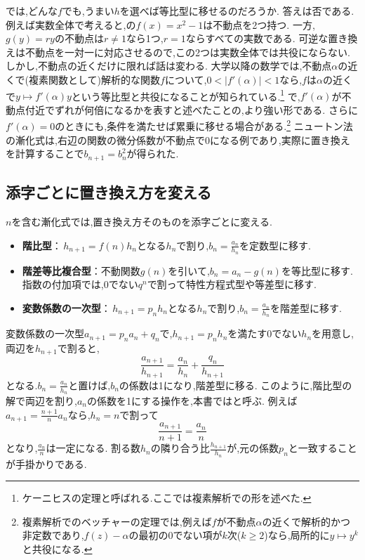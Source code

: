 では,どんな$f$でも,うまい$h$を選べば等比型に移せるのだろうか.
答えは否である.例えば実数全体で考えると,の$f(x)=x^2-1$は不動点を2つ持つ.
一方,$g(y)=ry$の不動点は$r\ne1$なら1つ,$r=1$ならすべての実数である.
可逆な置き換えは不動点を一対一に対応させるので,この2つは実数全体では共役にならない.
しかし,不動点の近くだけに限れば話は変わる.
大学以降の数学では,不動点$\alpha$の近くで(複素関数として)解析的な関数$f$について,$0<|f'(\alpha)|<1$なら,$f$は$\alpha$の近くで$y\mapsto f'(\alpha)y$という等比型と共役になることが知られている.\footnote{ケーニヒスの定理と呼ばれる.ここでは複素解析での形を述べた.}
で,$f'(\alpha)$が不動点付近でずれが何倍になるかを表すと述べたことの,より強い形である.
さらに$f'(\alpha)=0$のときにも,条件を満たせば累乗に移せる場合がある.\footnote{複素解析でのベッチャーの定理では,例えば$f$が不動点$\alpha$の近くで解析的かつ非定数であり,$f(z)-\alpha$の最初の0でない項が$k$次($k\ge2$)なら,局所的に$y\mapsto y^k$と共役になる.}
ニュートン法の漸化式は,右辺の関数の微分係数が不動点で0になる例であり,実際に置き換えを計算することで$b_{n+1}=b_n^2$が得られた.

\subsection{添字ごとに置き換え方を変える}\label{節：添字ごとに置き換え方を変える}

$n$を含む漸化式では,置き換え方そのものを添字ごとに変える.
\begin{itemize}
  \item \textbf{階比型}：\,$h_{n+1}=f(n)h_n$となる$h_n$で割り,$b_n=\frac{a_n}{h_n}$を定数型に移す.
  \item \textbf{階差等比複合型}：不動関数$g(n)$を引いて,$b_n=a_n-g(n)$を等比型に移す.指数の付加項では,0でない$q^n$で割って特性方程式型や等差型に移す.
  \item \textbf{変数係数の一次型}：\,$h_{n+1}=p_nh_n$となる$h_n$で割り,$b_n=\frac{a_n}{h_n}$を階差型に移す.
\end{itemize}
\label{節：正規化}
変数係数の一次型$a_{n+1}=p_na_n+q_n$で,$h_{n+1}=p_nh_n$を満たす0でない$h_n$を用意し,両辺を$h_{n+1}$で割ると,
\[
  \frac{a_{n+1}}{h_{n+1}}=\frac{a_n}{h_n}+\frac{q_n}{h_{n+1}}
\]
となる.$b_n=\frac{a_n}{h_n}$と置けば,$b_n$の係数は1になり,階差型に移る.
このように,階比型の解で両辺を割り,$a_n$の係数を1にする操作を,本書では\textbf{}と呼ぶ.
例えば$a_{n+1}=\frac{n+1}{n}a_n$なら,$h_n=n$で割って
\[
  \frac{a_{n+1}}{n+1}=\frac{a_n}{n}
\]
となり,$\frac{a_n}{n}$は一定になる.
割る数$h_n$の隣り合う比$\frac{h_{n+1}}{h_n}$が,元の係数$p_n$と一致することが手掛かりである.

